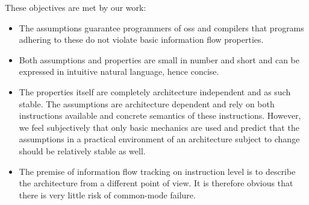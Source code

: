 These objectives are met by our work:
\begin{itemize}
    \item The assumptions guarantee programmers of \glspl{os} and compilers that programs adhering to these do not violate basic information flow properties.
    \item Both assumptions and properties are small in number and short and can be expressed in intuitive natural language, hence concise.
    \item The properties itself are completely architecture independent and as such stable.
    The assumptions are architecture dependent and rely on both instructions available and concrete semantics of these instructions.
    However, we feel subjectively that only basic mechanics are used and predict that the assumptions in a practical environment of an architecture subject to change should be relatively stable as well.
    \item The premise of information flow tracking on instruction level is to describe the architecture from a different point of view.
    It is therefore obvious that there is very little risk of common-mode failure.
\end{itemize}

